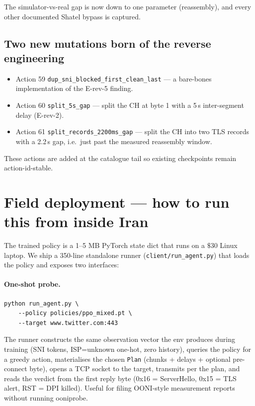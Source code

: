 \documentclass[letterpaper,twocolumn,10pt]{article}
\begin{document}
The simulator-vs-real gap is now down to one parameter
(reassembly), and every other documented Shatel bypass is captured.

\subsection{Two new mutations born of the reverse engineering}

\begin{itemize}
    \item Action 59 \texttt{dup\_sni\_blocked\_first\_clean\_last} —
    a bare-bones implementation of the E-rev-5 finding.
    \item Action 60 \texttt{split\_5s\_gap} — split the CH at byte 1
    with a 5\,s inter-segment delay (E-rev-2).
    \item Action 61 \texttt{split\_records\_2200ms\_gap} — split the
    CH into two TLS records with a 2.2\,s gap, i.e.\ just past the
    measured reassembly window.
\end{itemize}

These actions are added at the catalogue tail so existing
checkpoints remain action-id-stable.

\section{Field deployment — how to run this from inside Iran}
\label{sec:deployment}

The trained policy is a 1--5 MB PyTorch state dict that runs on a
$\$30$ Linux laptop. We ship a 350-line standalone runner
(\texttt{client/run\_agent.py}) that loads the policy and exposes
two interfaces:

\paragraph{One-shot probe.}
{\small\begin{verbatim}
python run_agent.py \
    --policy policies/ppo_mixed.pt \
    --target www.twitter.com:443
\end{verbatim}}
The runner constructs the same observation vector the env produces
during training (SNI tokens, ISP=unknown one-hot, zero history),
queries the policy for a greedy action, materialises the chosen
\texttt{Plan} (chunks + delays + optional pre-connect byte), opens
a TCP socket to the target, transmits per the plan, and reads the
verdict from the first reply byte (0x16 = ServerHello, 0x15 = TLS
alert, RST = DPI killed). Useful for filing OONI-style measurement
reports without running ooniprobe.
\end{document}
